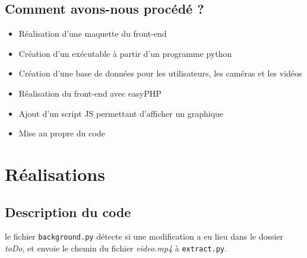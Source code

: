 \documentclass[12pt]{article}
\begin{document}
\subsection{Comment avons-nous procédé ?}
\begin{itemize}
     \item Réalisation d’une maquette du front-end
     \item Création d’un exécutable à partir d’un programme python
     \item Création d’une base de données pour les utilisateurs, les caméras et les vidéos
     \item Réalisation du front-end avec easyPHP
     \item Ajout d’un script JS permettant d’afficher un graphique
     \item Mise au propre du code
\end{itemize}

\clearpage

\section{Réalisations}

\subsection{Description du code}
le fichier \texttt{background.py} détecte si une modification a eu lieu dans le dossier \textit{toDo}, et envoie le chemin du fichier \textit{video.mp4} à \texttt{extract.py}.
\end{document}
